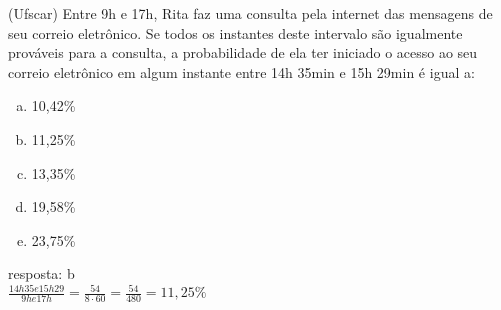 \begin{ex}
(Ufscar) Entre 9h e 17h, Rita faz uma consulta pela internet das mensagens de seu correio eletrônico. Se todos os instantes deste intervalo são igualmente prováveis para a consulta, a probabilidade de ela ter iniciado o acesso ao seu correio eletrônico em algum instante entre 14h 35min e 15h 29min é igual a:
   \begin{enumerate}[(a)]
   \item 10,42\%
   \item 11,25\%
   \item 13,35\%
   \item 19,58\%
   \item 23,75\%
   \end{enumerate}
     \begin{sol}
      resposta: b \\
      $\frac{14h35 e 15h29}{9h e 17 h}=\frac{54}{8\cdot60}=\frac{54}{480}=11,25\%$
     \end{sol}
\end{ex}